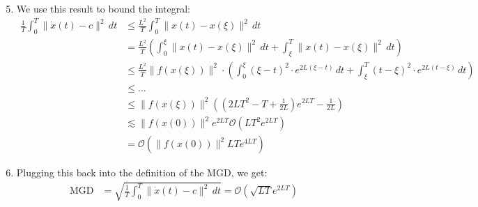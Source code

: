 \begin{enumerate}
    \setcounter{enumi}{4}
    \item We use this result to bound the integral:
    \[
    \begin{aligned}
    \frac{1}{T} \int_0^T \|\dot{x}(t) - c\|^2 \, dt
    &\leq \frac{L^2}{T} \int_0^T \|x(t) - x(\xi)\|^2 \, dt
    \\&= \frac{L^2}{T} \left( \int_0^\xi \|x(t) - x(\xi)\|^2 \, dt + \int_\xi^T \|x(t) - x(\xi)\|^2 \, dt \right)
    \\&\leq \frac{L^2}{T} \|f(x(\xi))\|^2 \cdot \left( \int_0^\xi (\xi - t)^2 \cdot e^{2L(\xi - t)} \, dt + \int_\xi^T (t - \xi)^2 \cdot e^{2L(t - \xi)} \, dt \right)
    \\&\leq \dots
    \\&\leq \|f(x(\xi))\|^2 \left( (2LT^2 - T + \frac{1}{2L}) e^{2LT} - \frac{1}{2L} \right)
    \\&\lesssim \|f(x(0))\|^2 e^{2LT} \mathcal{O}(LT^2 e^{2LT})
    \\&= \mathcal{O}\left(\|f(x(0))\|^2 LTe^{4LT}\right)
    \end{aligned}
    \]
\end{enumerate}

\begin{enumerate}
    \setcounter{enumi}{5}
    \item Plugging this back into the definition of the MGD, we get:
    \[
    \begin{aligned}
    \text{MGD} &= \sqrt{\frac{1}{T} \int_0^T \|\dot{x}(t) - c\|^2 \, dt} = \mathcal{O}(\sqrt{LT} e^{2LT})
    \end{aligned}
    \]
\end{enumerate}
